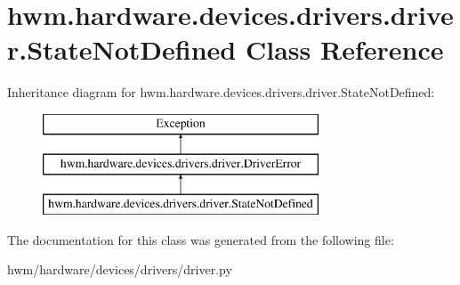 \hypertarget{classhwm_1_1hardware_1_1devices_1_1drivers_1_1driver_1_1_state_not_defined}{\section{hwm.\-hardware.\-devices.\-drivers.\-driver.\-State\-Not\-Defined Class Reference}
\label{classhwm_1_1hardware_1_1devices_1_1drivers_1_1driver_1_1_state_not_defined}
}
Inheritance diagram for hwm.\-hardware.\-devices.\-drivers.\-driver.\-State\-Not\-Defined\-:\begin{figure}[H]
\begin{center}
\leavevmode
\includegraphics[height=3.000000cm]{classhwm_1_1hardware_1_1devices_1_1drivers_1_1driver_1_1_state_not_defined}
\end{center}
\end{figure}


The documentation for this class was generated from the following file\-:\begin{DoxyCompactItemize}
\item 
hwm/hardware/devices/drivers/driver.\-py\end{DoxyCompactItemize}
